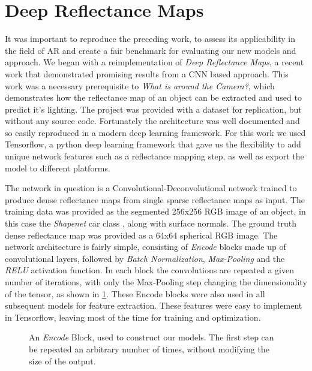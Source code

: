 \documentclass[ %
                    author={Gavin Parker},
                supervisor={Dr. Neill Campbell},
                    degree={MEng},
                     title={Deep Siamese Networks for Illumination Estimation from Stereo Images},
                  subtitle={},
                      type={Research},
                      year={2018} ]{dissertation}
\begin{document}
\section{Deep Reflectance Maps}
It was important to reproduce the preceding work, to assess its applicability in the field of AR and create a fair benchmark for evaluating our new models and approach. We began with a reimplementation of \textit{Deep Reflectance Maps}, a recent work that demonstrated promising results from a CNN based approach. This work was a necessary prerequisite to \textit{What is around the Camera?}, which demonstrates how the reflectance map of an object can be extracted and used to predict it's lighting. The project was provided with a dataset for replication, but without any source code. Fortunately the architecture was well documented and so easily reproduced in a modern deep learning framework. For this work we used Tensorflow, a python deep learning framework that gave us the flexibility to add unique network features such as a reflectance mapping step, as well as export the model to different platforms.

The network in question is a Convolutional-Deconvolutional network trained to produce dense reflectance maps from single sparse reflectance maps as input. The training data was provided as the segmented 256x256 RGB image of an object, in this case the \textit{Shapenet} car class \cite{DBLP:journals/corr/ChangFGHHLSSSSX15}, along with surface normals. The ground truth dense reflectance map was provided as a 64x64 spherical RGB image.
\newline
The network architecture is fairly simple, consisting of \textit{Encode} blocks made up of convolutional layers, followed by \textit{Batch Normalization}, \textit{Max-Pooling} and the \textit{RELU} activation function. In each block the convolutions are repeated a given number of iterations, with only the Max-Pooling step changing the dimensionality of the tensor, as shown in \ref{encode}. These Encode blocks were also used in all subsequent models for feature extraction. These features were easy to implement in Tensorflow, leaving most of the time for training and optimization.
\begin{figure}[H]
\centering
{}

\caption{An \textit{Encode} Block, used to construct our models. The first step can be repeated an arbitrary number of times, without modifying the size of the output.}
\label{encode}
\end{figure}
\end{document}

